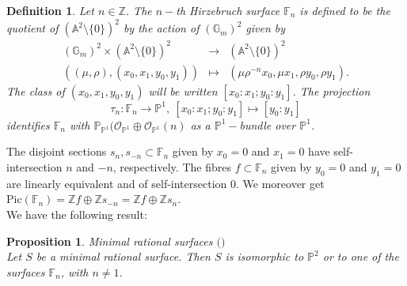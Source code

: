 \documentclass[leqno,12pt]{amsart} %
\newtheorem{prop}[thm]{Proposition}
\newtheorem{defi}[thm]{Definition}
\renewcommand{\to}{\longrightarrow}
\newcommand{\Z}{\ensuremath{\mathbb{Z}}}
\newcommand{\F}{\ensuremath{\mathbb{F} }}
\newcommand{\p}{\ensuremath{\mathbb{P} }}
\newcommand{\Pic}{{\mathrm{Pic}}}
\begin{document}
 
 \begin{defi}\label{def-03}
    Let $n \in\Z$. The $n-$th Hirzebruch surface $\F_n$ is defined to be the quotient of $(\mathbb{A}^2\setminus\{0\})^2$ by the action of $(\mathbb{G}_m)^2$ given by
  \begin{eqnarray*}
        (\mathbb{G}_m)^2\times(\mathbb{A}^2\setminus\{0\})^2&\to& (\mathbb{A}^2\setminus\{0\})^2\\
        \left((\mu,\rho),(x_0,x_1,y_0,y_1)\right)&\mapsto& \left(\mu\rho^{-n}x_0,\mu x_1,\rho y_0,\rho y_1\right).
    \end{eqnarray*}
The class of $(x_0,x_1,y_0,y_1)$ will be written $[x_0:x_1;y_0:y_1]$. The projection
\begin{equation*}
    \tau_{n}:\F_n\to{\p^1},~ [x_0:x_1;y_0:y_1]\mapsto[y_0:y_1]
\end{equation*} 
identifies $\F_n$ with $\p_{{\p^1}}(\mathcal{O}_{{\p^1}}\oplus\mathcal{O}_{{\p^1}}(n)$ as a ${\p^1}-$bundle over ${\p^1}$.
\end{defi}
The disjoint sections $s_{n},s_{-n}\subset\F_n$ given by $x_0 = 0$ and $x_1 = 0$ have self-intersection $n$ and $-n$, respectively.
The fibres $f \subset\F_n$ given by $y_0 = 0$ and $y_1 = 0$ are linearly equivalent and of self-intersection $0$. We moreover get $\Pic(\F_n)=\Z f\oplus\Z s_{-n}= \Z f\oplus\Z s_{n}$.\\[3mm] We have the following result:

\begin{prop} Minimal rational surfaces $($\cite[Theorem V.10]{MR1406314}$)$ \\
Let $S$ be a minimal rational surface. Then $S$ is isomorphic to $\p^2$ or to one of the surfaces
$\F_n$, with $n\neq 1$.
\end{prop}
\end{document}
